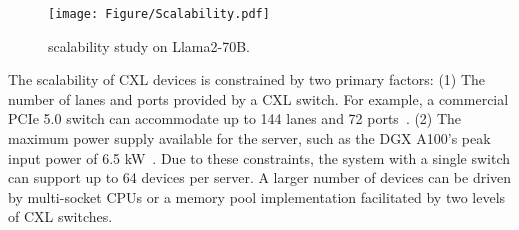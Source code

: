 

\begin{figure}[h]
	\centering
  	\texttt{[image: Figure/Scalability.pdf]}
    \caption{\att{} scalability study on Llama2-70B.}
	\label{fig:Scalability}
\end{figure}

The scalability of CXL devices is constrained by two primary factors: (1) The number of lanes and ports provided by a CXL switch. For example, a commercial PCIe 5.0 switch can accommodate up to 144 lanes and 72 ports~\cite{pcie5-switch}. (2) The maximum power supply available for the server, such as the DGX A100's peak input power of 6.5 kW~\cite{dgx-a100}. 
Due to these constraints, the \att{} system with a single switch can support up to 64 devices per server.
A larger number of devices can be driven by multi-socket CPUs or a memory pool implementation facilitated by two levels of CXL switches.

